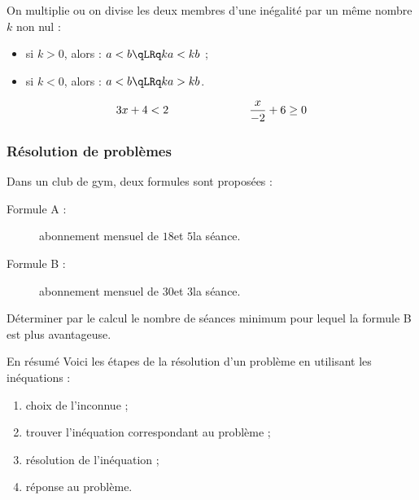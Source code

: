 \documentclass[xcolor={dvipsnames,svgnames,table}]{beamer}
\begin{document}
\begin{frame}
    \begin{Proof}
        \rule{0pt}{6cm}
    \end{Proof}
\end{frame}

\begin{frame}
    \begin{Prop}
        On multiplie ou on divise les deux membres d'une inégalité par un même nombre $k$ non nul :
        \begin{itemize}
            \item si $k > 0$, alors : \quad $a < b \qLRq ka < kb$ ;
            \item si $k < 0$, alors : \quad $a < b \qLRq ka > kb$.
        \end{itemize}
    \end{Prop}
\pause
    \begin{Examples}
        \[3x + 4 < 2 \hspace{2.5cm} \frac{x}{-2} + 6 \geq 0\]
        \rule{0pt}{2.5cm}
    \end{Examples}
\end{frame}

\begin{frame}
    \begin{Proof}
        \rule{0pt}{6cm}
    \end{Proof}
\end{frame}

\subsubsection{Résolution de problèmes}

\begin{frame}
    \begin{Example}
        Dans un club de gym, deux formules sont proposées :
        \begin{description}
            \item[Formule A :] abonnement mensuel de $18$\EUR et $5$\EUR la séance.
            \item[Formule B :] abonnement mensuel de $30$\EUR et $3$\EUR la séance.
        \end{description}
        Déterminer par le calcul le nombre de séances minimum pour lequel la formule B est plus avantageuse.
        
    \rule{0pt}{4cm}
    \end{Example}
\end{frame}

\begin{frame}{En résumé}
    Voici les étapes de la résolution d'un problème en utilisant les inéquations :\pause
    \begin{enumerate}
        \item choix de l'inconnue ;\pause
        \item trouver l'inéquation correspondant au problème ;\pause
        \item résolution de l'inéquation ;\pause
        \item réponse au problème.
    \end{enumerate}
\end{frame}
\end{document}
